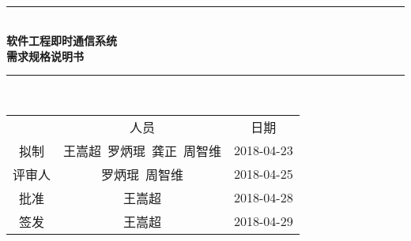 \documentclass[bachelor]{ustcthesis}
\newcommand{\docname}{软件工程即时通信系统}
\newcommand{\HRule}{\rule{\linewidth}{0.5mm}}
\begin{document}
\begin{titlepage}
\begin{center}
~\\[5cm]
\HRule \\[0.4cm]
{\huge \bfseries \docname\\需求规格说明书}\\[0.4cm]
\HRule \\[1.5cm]

\begin{tabular}{ccc}
  & 人员 & 日期 \\ 
拟制 & 王嵩超\ 罗炳琨\ 龚正\ 周智维 & 2018-04-23 \\ 
评审人 & 罗炳琨\ 周智维 & 2018-04-25 \\ 
批准 & 王嵩超& 2018-04-28 \\ 
签发 & 王嵩超& 2018-04-29 \\ 
\end{tabular} 

\end{center}
\end{titlepage}



\frontmatter

\tableofcontents
\listoffigures
\listoftables
% 

\mainmatter









%


\appendix


\end{document}
